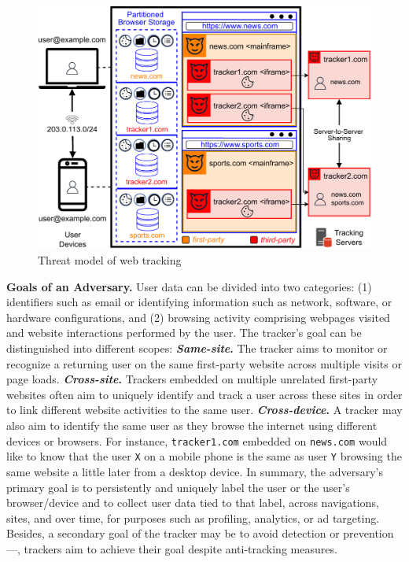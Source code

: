 \begin{figure}
    \vspace{-2mm}
    \centering
    \includegraphics[width=0.99\linewidth]{figures/threat-model.pdf}
    \caption{Threat model of web tracking}
    \label{fig:threat-model}
    \vspace{-3mm} %
\end{figure}



\noindent \textbf{Goals of an Adversary.} 
%
%
User data can be divided into two categories: (1) identifiers such as email or identifying information such as network, software, or hardware configurations, and (2) browsing activity comprising webpages visited and website interactions performed by the user. 
%
The tracker's goal can be distinguished into different scopes:
%
\noindent \textbf{\textit{Same-site}.} 
The tracker aims to monitor or recognize a returning user on the same first-party website across multiple visits or page loads. 
%
\textbf{\textit{Cross-site}.} 
%
Trackers embedded on multiple unrelated first-party websites often aim to uniquely identify and track a user across these sites in order to link different website activities to the same user.
%
\textbf{\textit{Cross-device}.} 
%
A tracker may also aim to identify the same user as they browse the internet using different devices or browsers. 
%
For instance, \texttt{tracker1.com} embedded on \texttt{news.com} would like to know that the user \texttt{X} on a mobile phone is the same as user \texttt{Y} browsing the same website a little later from a desktop device.
%
In summary, the adversary's primary goal is to persistently and uniquely label the user or the user’s browser/device and to collect user data tied to that label, across navigations, sites, and over time, for purposes such as profiling, analytics, or ad targeting.
%
Besides, a secondary goal of the tracker may be to avoid detection or prevention---\ie{}, trackers aim to achieve their goal despite anti-tracking measures.



